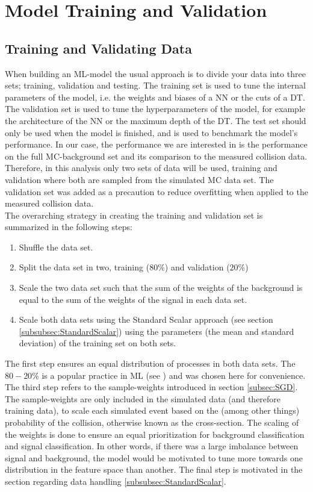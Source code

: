 \newpage
\section{Model Training and Validation}
\subsection{Training and Validating Data}\label{subsec:TraVal}
When building an \ac{ML}-model the usual approach is to divide your data into three sets; training, validation and 
testing. The training set is used to tune the internal parameters of the model, i.e. the weights and biases of a \ac{NN} or the cuts of a \ac{DT}.
The validation set is used to tune the hyperparameters of the model, for example the architecture of the \ac{NN} or the maximum depth of the \ac{DT}.
The test set should only be used when the model is finished, and is used to benchmark the model's performance. In our case, the performance we are 
interested in is the performance on the full \ac{MC}-background set and its comparison to the measured collision data. 
Therefore, in this analysis only two sets of data will be used, training and validation where both are sampled from the simulated
\ac{MC} data set. The validation set was added as a precaution to reduce overfitting when applied to the measured collision data.
\\
The overarching strategy in creating the training and validation set is summarized in the following steps:
\begin{enumerate}
    \item Shuffle the data set. 
    \item Split the data set in two, training ($80\%$) and validation ($20\%$)
    \item Scale the two data set such that the sum of the weights of the background is equal to the sum of the weights of the signal in each data set.
    \item Scale both data sets using the Standard Scalar approach (see section \ref{subsubsec:StandardScalar}) using the parameters (the mean and standard deviation) 
    of the training set on both sets.
\end{enumerate}
The first step ensures an equal distribution of processes in both data sets. The $80-20\%$ is a popular practice in \ac{ML} (see \cite{8020}) and was chosen 
here for convenience. The third step refers to the sample-weights introduced in section \ref{subsec:SGD}. The sample-weights are only included in the simulated data
(and therefore training data), to scale each simulated event based on the (among other things) probability of the collision, otherwise known as the cross-section. The scaling of the 
weights is done to ensure an equal prioritization for background classification and signal classification. In other words, if there was a large imbalance between signal and background, 
the model would be motivated to tune more towards one distribution in the feature space than another. The final step is motivated in the section regarding data handling \ref{subsubsec:StandardScalar}. 

